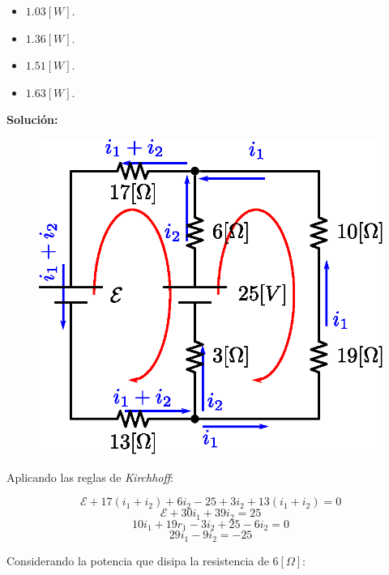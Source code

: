 \documentclass[letter,11pt]{article}
\begin{document}
\begin{enumerate}
\begin{itemize}
    \item $1.03 [W]$.
    \item $1.36 [W]$.
    \item $1.51 [W]$.
    \item $1.63 [W]$.
\end{itemize}

\textbf{Solución:}

\begin{figure}[!h]
\centering
\includegraphics[scale=0.70]{resources/a3.eps}
\end{figure}

Aplicando las reglas de \emph{Kirchhoff}:

\begin{equation*}
    \mathcal{E}+17(i_1+i_2)+6i_2-25+3i_2+13(i_1+i_2)=0
\end{equation*}
\begin{equation*}
    \mathcal{E}+30i_1+39i_2=25
\end{equation*}
\begin{equation*}
    10i_1+19r_1-3i_2+25-6i_2=0
\end{equation*}
\begin{equation*}
    29i_1-9i_2=-25
\end{equation*}

Considerando la potencia que disipa la resistencia de $6 [\Omega]$:


\end{enumerate}
\end{document}
